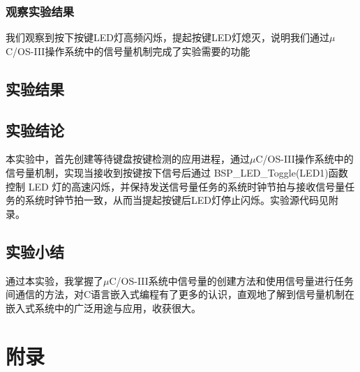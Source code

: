 ﻿\documentclass[UTF8,12pt]{article}
\begin{document}
\subsubsection{观察实验结果}
我们观察到按下按键LED灯高频闪烁，提起按键LED灯熄灭，说明我们通过$\mu$C/OS-III操作系统中的信号量机制完成了实验需要的功能

\subsection{实验结果}

\subsection{实验结论}
本实验中，首先创建等待键盘按键检测的应用进程，通过$\mu$C/OS-III操作系统中的信号量机制，实现当接收到按键按下信号后通过 BSP\_LED\_Toggle(LED1)函数控制 LED 灯的高速闪烁，并保持发送信号量任务的系统时钟节拍与接收信号量任务的系统时钟节拍一致，从而当提起按键后LED灯停止闪烁。实验源代码见附录。

\subsection{实验小结}
通过本实验，我掌握了$\mu$C/OS-III系统中信号量的创建方法和使用信号量进行任务间通信的方法，对C语言嵌入式编程有了更多的认识，直观地了解到信号量机制在嵌入式系统中的广泛用途与应用，收获很大。

\newpage

\section{附录}
\end{document}
